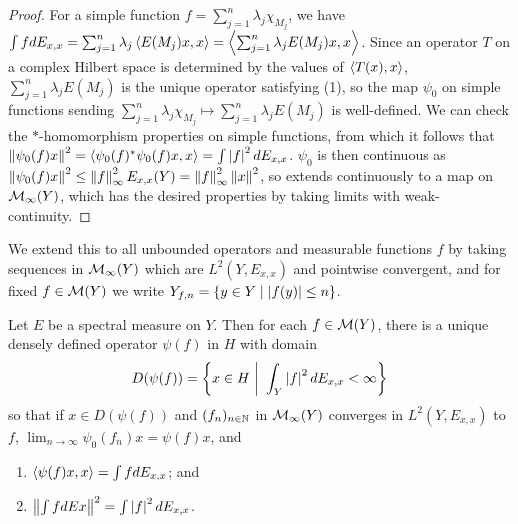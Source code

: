 \documentclass[10pt]{amsart}
\begin{document}
\begin{proof}
    For a simple function $f = \sum_{j = 1}^n \lambda_j \chi_{M_j}$, we have $\int f dE_{x, x} = \sum_{j = 1}^n\lambda_j\left\langle E(M_j)x, x \right\rangle = \left\langle \sum_{j = 1}^n \lambda_j E(M_j)x, x \right\rangle$. Since an operator $T$ on a complex Hilbert space is determined by the values of $\left\langle T(x), x \right\rangle$, $\sum_{j = 1}^n \lambda_j E(M_j)$ is the unique operator satisfying (1), so the map $\psi_0$ on simple functions sending $\sum_{j = 1}^n \lambda_j \chi_{M_j} \mapsto \sum_{j = 1}^n \lambda_j E(M_j)$ is well-defined. We can check the $*$-homomorphism properties on simple functions, from which it follows that $\left\| \psi_0(f)x \right\|^2 = \left\langle \psi_0(f)^*\psi_0(f)x, x \right\rangle = \int \left| f \right|^2 dE_{x, x}$. $\psi_0$ is then continuous as $\left\| \psi_0(f)x \right\|^2 \leq \left\| f \right\|^2_\infty E_{x, x}(Y) = \left\| f \right\|_\infty^2\left\| x \right\|^2$, so extends continuously to a map on $\mathcal{M}_\infty(Y)$, which has the desired properties by taking limits with weak-continuity.
\end{proof}
We extend this to all unbounded operators and measurable functions $f$ by taking sequences in $\mathcal{M}_\infty(Y)$ which are $L^2(Y, E_{x, x})$ and pointwise convergent, and for fixed $f \in \mathcal{M}(Y)$ we write $Y_{f, n} = \left\{  y \in Y \mid \left| f(y) \right| \leq n  \right\}$.
\begin{proposition}\label{unbdint}
    Let $E$ be a spectral measure on $Y$. Then for each $f \in \mathcal{M}(Y)$, there is a unique densely defined operator $\psi(f)$ in $H$ with domain
    $$
        D(\psi(f)) = \set{x \in H \ \bigg| \ \int_Y \abs{f}^2 dE_{x, x} < \infty}
    $$
    so that if $x \in D(\psi(f))$ and $(f_n)_{n \in \mathbb{N}}$ in $\mathcal{M}_\infty(Y)$ converges in $L^2(Y, E_{x, x})$ to $f$, $\lim_{n \to \infty}\psi_0(f_n)x = \psi(f)x$, and
    \begin{enumerate}
        \item $\left\langle \psi(f)x, x \right\rangle = \int f dE_{x, x}$; and
        \item $\left\| \int f dE x \right\|^2 = \int \left| f \right|^2 dE_{x, x}$.
    \end{enumerate}
\end{proposition}
\end{document}
